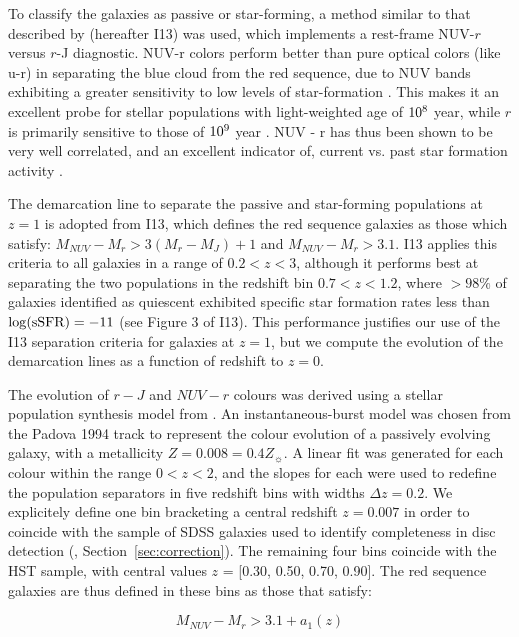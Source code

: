 \documentclass[useAMS,usenatbib]{mn2e}
\begin{document}
To classify the galaxies as passive or star-forming, a method similar to that described by \citet{Ilbert2013} (hereafter I13) was used, which implements a rest-frame NUV-$r$ versus $r$-J diagnostic. NUV-r colors perform better than pure optical colors (like u-r) in separating the blue cloud from the red sequence, due to NUV bands exhibiting a greater sensitivity to low levels of star-formation \citep{Martin2007,Wyder2007}. This makes it an excellent probe for stellar populations with light-weighted age of $\rm 10^8$ year, while $r$ is primarily sensitive to those of $\rm 10^9$ year \citep{Arnouts2007a}. NUV - r has thus been shown to be very well correlated, and an excellent indicator of, current vs. past star formation activity \citep{Martin2005,Salim2005a}.  

The demarcation line to separate the passive and star-forming populations at $z=1$ is adopted from I13, which defines the red sequence galaxies as those which satisfy: $M_{NUV}-M_{r} > 3(M_{r}-M_{J})+1$ and $M_{NUV}-M_{r} > 3.1$. I13 applies this criteria to all galaxies in a range of $0.2<z<3$, although it performs best at separating the two populations in the redshift bin $0.7<z<1.2$, where $>98\%$ of galaxies identified as quiescent exhibited specific star formation rates less than $\rm \log(sSFR) = -11$ (see Figure 3 of I13). This performance justifies our use of the I13 separation criteria for galaxies at $z=1$, but we compute the evolution of the demarcation lines as a function of redshift to $z=0$. 

The evolution of $r-J$ and $NUV-r$ colours was derived using a stellar population synthesis model from \citet{Bruzual2003}. An instantaneous-burst model was chosen from the Padova 1994 track to represent the colour evolution of a passively evolving galaxy, with a metallicity $Z=0.008=0.4Z_{\sun}$. A linear fit was generated for each colour within the range $0<z<2$, and the slopes for each were used to redefine the population separators in five redshift bins with widths $\Delta z=0.2$. We explicitely define one bin bracketing a central redshift $z=0.007$ in order to coincide with the sample of SDSS galaxies used to identify completeness in disc detection (, Section~\ref{sec:correction}). The remaining four bins coincide with the HST sample, with central values $z$ = [0.30, 0.50, 0.70, 0.90]. The red sequence galaxies are thus defined in these bins as those that satisfy:

\begin{equation}
M_{NUV}-M_{r} > 3.1 + a_{1}(z)
\end{equation}
\end{document}
